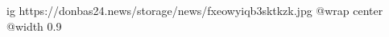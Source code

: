  
 
 
 
 

\ifcmt
  ig https://donbas24.news/storage/news/fxeowyiqb3sktkzk.jpg
  @wrap center
  @width 0.9
\fi
